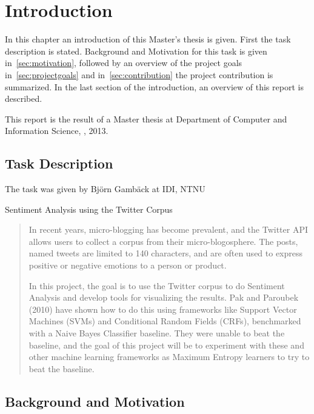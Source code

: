 \chapter{Introduction}

In this chapter an introduction of this Master's thesis is given. First the task description is stated. Background and Motivation for this task is given in~\autoref{sec:motivation}, followed by an overview of the project goals in~\autoref{sec:projectgoals} and in~\autoref{sec:contribution} the project contribution is summarized. In the last section of the introduction, an overview of this report is described. 

This report is the result of a Master thesis at Department of Computer and Information Science, , 2013. 

\section{Task Description}
\label{sec:task}

The task was given by Bj\"{o}rn Gamb\"{a}ck at IDI, NTNU

\begin{center} \Large Sentiment Analysis using the Twitter Corpus \end{center}
\begin{quotation}
In recent years, micro-blogging has become prevalent, and the Twitter API allows users to collect a corpus from their micro-blogosphere. The posts, named tweets are limited to 140 characters, and are often used to express positive or negative emotions to a person or product.

In this project, the goal is to use the Twitter corpus to do Sentiment Analysis and develop tools for visualizing the results. Pak and Paroubek (2010) have shown how to do this using frameworks like Support Vector Machines (SVMs) and Conditional Random Fields (CRFs), benchmarked with a Naive Bayes Classifier baseline. They were unable to beat the baseline, and the goal of this project will be to experiment with these and other machine learning frameworks as Maximum Entropy learners to try to beat the baseline.
\end{quotation}


\section{Background and Motivation}
\label{sec:motivation}

